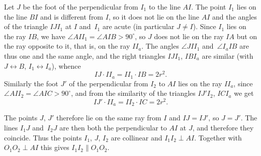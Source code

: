 {    Let $J$ be the foot of the perpendicular from $I_1$ to the line $AI$. The point $I_1$ lies on the line $BI$ and is different from $I$, so it does not lie on the line $AI$ and the angles of the triangle $IJI_1$ at $I$ and~$I_1$ are acute (in particular $J \neq I$). Since $I_1$ lies on the ray $IB$, we have $\angle AII_1 = \angle AIB > 90^\circ$, so $J$ does not lie on the ray $IA$ but on the ray opposite to it, that is, on the ray $II_a$. The angles $\angle JII_1$ and~$\angle I_aIB$ are thus one and the same angle, and the right triangles $IJI_1$, $IBI_a$ are similar (with $J \leftrightarrow B$, $I_1 \leftrightarrow I_a$), whence
    $$
    IJ \cdot II_a = II_1 \cdot IB = 2r^2.
    $$
    Similarly the foot $J'$ of the perpendicular from $I_2$ to $AI$ lies on the ray $II_a$, since $\angle AII_2 = \angle AIC > 90^\circ$, and from the similarity of the triangles $IJ'I_2$, $ICI_a$ we get
    $$
    IJ' \cdot II_a = II_2 \cdot IC = 2r^2.
    $$

    The points $J$, $J'$ therefore lie on the same ray from $I$ and $IJ = IJ'$, so $J = J'$. The lines $I_1J$ and~$I_2J$ are then both the perpendicular to $AI$ at $J$, and therefore they coincide. Thus the points $I_1$, $J$, $I_2$ are collinear and $I_1I_2 \perp AI$. Together with $O_1O_2 \perp AI$ this gives $I_1I_2 \parallel O_1O_2$.
}

